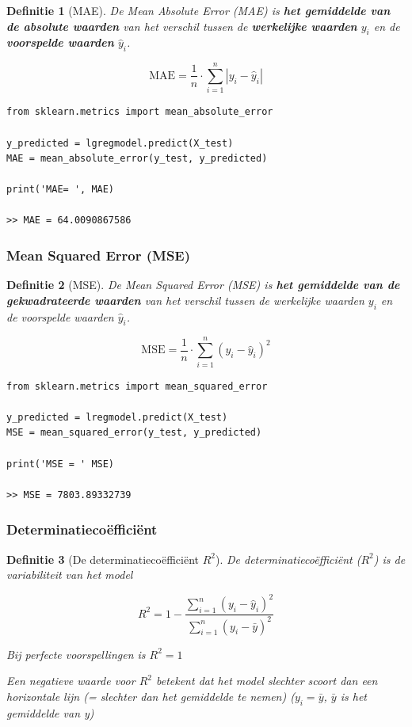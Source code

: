 \documentclass{article}
\newtheorem{theorem}{Definitie}[section]
\begin{document}
\begin{theorem}[MAE]
De Mean Absolute Error (MAE) is \textbf{het gemiddelde van de absolute waarden} van het verschil
tussen de \textbf{werkelijke waarden} $y_i$ en de \textbf{voorspelde waarden} $\hat{y}_i$.

\begin{equation}
\text{MAE} = \frac{1}{n} \cdot \sum_{i=1}^n | y_i - \hat{y}_i |
\end{equation}
\end{theorem}

\begin{verbatim}
from sklearn.metrics import mean_absolute_error

y_predicted = lgregmodel.predict(X_test)
MAE = mean_absolute_error(y_test, y_predicted)

print('MAE= ', MAE)

>> MAE = 64.0090867586

\end{verbatim}

\subsubsection{Mean Squared Error (MSE)}

\begin{theorem}[MSE]
De Mean Squared Error (MSE) is \textbf{het gemiddelde van de gekwadrateerde waarden} van het verschil tussen de werkelijke waarden $y_i$ en
de voorspelde waarden $\hat{y}_i$.

\begin{equation}
\text{MSE} = \frac{1}{n} \cdot \sum_{i=1}^n ( y_i - \hat{y}_i )^2
\end{equation}
\end{theorem}

\begin{verbatim}
from sklearn.metrics import mean_squared_error

y_predicted = lregmodel.predict(X_test)
MSE = mean_squared_error(y_test, y_predicted)

print('MSE = ' MSE)

>> MSE = 7803.89332739
\end{verbatim}


\subsubsection{Determinatiecoëfficiënt}

\begin{theorem}[De determinatiecoëfficiënt $R^2$]
De determinatiecoëfficiënt ($R^2$) is de variabiliteit van het model

\begin{equation}
R^2 = 1 - \frac{\sum_{i=1}^n (y_i - \hat{y}_i)^2 }{\sum_{i=1}^n (y_i - \bar{y})^2}
\end{equation}

Bij perfecte voorspellingen is $R^2 = 1$

Een negatieve waarde voor $R^2$ betekent dat het model slechter scoort dan een horizontale lijn (= slechter dan het gemiddelde te nemen) ($y_i = \bar{y}$, $\bar{y}$ is het gemiddelde van y)
\end{theorem}
\end{document}
